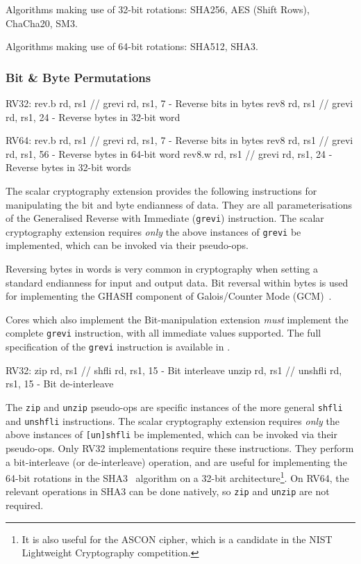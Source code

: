 Algorithms making use of 32-bit rotations:
SHA256, AES (Shift Rows), ChaCha20, SM3.

Algorithms making use of 64-bit rotations:
SHA512, SHA3.

\subsubsection{Bit \& Byte Permutations}
\label{sec:scalar:bitmanip:grev}

\begin{cryptobitmanipisa}
RV32:
    rev.b   rd, rs1 // grevi rd, rs1,  7 - Reverse bits in bytes
    rev8    rd, rs1 // grevi rd, rs1, 24 - Reverse bytes in 32-bit word

RV64:
    rev.b   rd, rs1 // grevi rd, rs1,  7 - Reverse bits in bytes
    rev8    rd, rs1 // grevi rd, rs1, 56 - Reverse bytes in 64-bit word
    rev8.w  rd, rs1 // grevi rd, rs1, 24 - Reverse bytes in 32-bit words
\end{cryptobitmanipisa}

The scalar cryptography extension provides the following instructions for
manipulating the bit and byte endianness of data.
They are all parameterisations of the Generalised Reverse with Immediate
({\tt grevi}) instruction.
The scalar cryptography extension requires {\em only} the above instances
of {\tt grevi} be implemented, which can be invoked via their pseudo-ops.

Reversing bytes in words is very common in cryptography when setting a
standard endianness for input and output data.
Bit reversal within bytes is used for implementing the GHASH  component
of Galois/Counter Mode (GCM)~\cite{nist:gcm}.

Cores which also implement the Bit-manipulation extension {\em must}
implement the complete {\tt grevi} instruction, with all immediate values
supported.
The full specification of the {\tt grevi} instruction is available in
\cite[Section 2.2.2]{riscv:bitmanip:draft}.

\begin{cryptobitmanipisa}
RV32:
    zip     rd, rs1 // shfli   rd, rs1, 15 - Bit interleave
    unzip   rd, rs1 // unshfli rd, rs1, 15 - Bit de-interleave
\end{cryptobitmanipisa}

The {\tt zip} and {\tt unzip} pseudo-ops are specific instances of
the more general {\tt shfli} and {\tt unshfli} instructions.
The scalar cryptography extension requires {\em only} the above instances
of {\tt [un]shfli} be implemented, which can be invoked via their
pseudo-ops.
Only RV32 implementations require these instructions.
They perform a bit-interleave (or de-interleave) operation, and are
useful for implementing the 64-bit rotations in the
SHA3~\cite{nist:fips:202} algorithm on
a 32-bit architecture\footnote{
It is also useful for the ASCON cipher, which is a candidate in the
NIST Lightweight Cryptography competition.
}.
On RV64, the relevant operations in SHA3 can be done natively, so
{\tt zip} and {\tt unzip} are not required.

